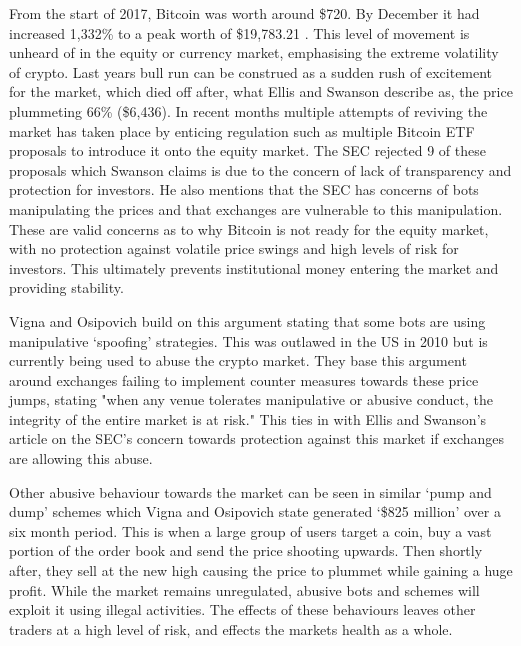 From the start of 2017, Bitcoin was worth around \$720. By December it had increased 1,332\% to a peak worth of \$19,783.21 \cite{ART:ELLIS:2018}. This level of movement is unheard of in the equity or currency market, emphasising the extreme volatility of crypto. Last years bull run can be construed as a sudden rush of excitement for the market, which died off after, what Ellis and Swanson \cite{ART:ELLIS:2018} describe as, the price plummeting 66\% (\$6,436). In recent months multiple attempts of reviving the market has taken place by enticing regulation such as multiple Bitcoin ETF proposals to introduce it onto the equity market. The SEC rejected 9 of these proposals which Swanson \cite{ART:ELLIS:2018} claims is due to the concern of lack of transparency and protection for investors. He also mentions that the SEC has concerns of bots manipulating the prices and that exchanges are vulnerable to this manipulation. These are valid concerns as to why Bitcoin is not ready for the equity market, with no protection against volatile price swings and high levels of risk for investors. This ultimately prevents institutional money entering the market and providing stability. 

Vigna and Osipovich \cite{ART:VIGNA:2018} build on this argument stating that some bots are using manipulative `spoofing' strategies. This was outlawed in the US in 2010 but is currently being used to abuse the crypto market. They base this argument around exchanges failing to implement counter measures towards these price jumps, stating "when any venue tolerates manipulative or abusive conduct, the integrity of the entire market is at risk." This ties in with Ellis and Swanson's article \cite{ART:ELLIS:2018} on the SEC's concern towards protection against this market if exchanges are allowing this abuse. 

Other abusive behaviour towards the market can be seen in similar `pump and dump' schemes which Vigna and Osipovich \cite{ART:VIGNA:2018} state generated `\$825 million' over a six month period. This is when a large group of users target a coin, buy a vast portion of the order book and send the price shooting upwards. Then shortly after, they sell at the new high causing the price to plummet while gaining a huge profit. While the market remains unregulated, abusive bots and schemes will exploit it using illegal activities. The effects of these behaviours leaves other traders at a high level of risk, and effects the markets health as a whole.

